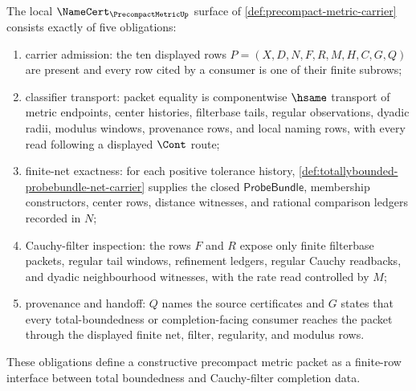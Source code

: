 \begin{theorem}
\label{thm:precompact-metric-namecert-obligations}
The local $\NameCert_{\PrecompactMetricUp}$ surface of
\autoref{def:precompact-metric-carrier} consists exactly of five obligations:
\begin{enumerate}
\item carrier admission: the ten displayed rows
  $P=(X,D,N,F,R,M,H,C,G,Q)$ are present and every row cited by a consumer is
  one of their finite subrows;
\item classifier transport: packet equality is componentwise $\hsame$
  transport of metric endpoints, center histories, filterbase tails, regular
  observations, dyadic radii, modulus windows, provenance rows, and local
  naming rows, with every read following a displayed $\Cont$ route;
\item finite-net exactness: for each positive tolerance history,
  \autoref{def:totallybounded-probebundle-net-carrier} supplies the closed
  $\mathsf{ProbeBundle}$, membership constructors, center rows, distance
  witnesses, and rational comparison ledgers recorded in $N$;
\item Cauchy-filter inspection: the rows $F$ and $R$ expose only finite
  filterbase packets, regular tail windows, refinement ledgers, regular
  Cauchy readbacks, and dyadic neighbourhood witnesses, with the rate read
  controlled by $M$;
\item provenance and handoff: $Q$ names the source certificates and $G$ states
  that every total-boundedness or completion-facing consumer reaches the
  packet through the displayed finite net, filter, regularity, and modulus
  rows.
\end{enumerate}
These obligations define a constructive precompact metric packet as a
finite-row interface between total boundedness and Cauchy-filter completion
data.
\end{theorem}
